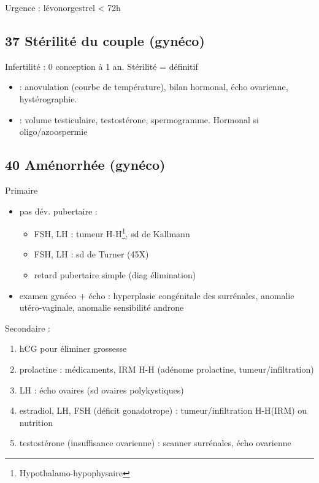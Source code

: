 \documentclass[11pt]{article}
\begin{document}
Urgence : lévonorgestrel < 72h
\subsection{37 Stérilité du couple (gynéco)}
\label{sec:orga8a0b33}
Infertilité : 0 conception à 1 an. Stérilité = définitif

\begin{itemize}
\item \female : anovulation (courbe de température), bilan hormonal, écho ovarienne, hystérographie.
\item \male : volume testiculaire, testostérone, spermogramme. Hormonal si oligo/azoospermie
\end{itemize}

\subsection{40 Aménorrhée (gynéco)}
\label{sec:org75b10ed}
Primaire
\begin{itemize}
\item pas dév. pubertaire :
\begin{itemize}
\item FSH, LH \dec : tumeur H-H\footnote{Hypothalamo-hypophysaire}, sd de Kallmann
\item FSH, LH \inc : sd de Turner (45X)
\item retard pubertaire simple (diag élimination)
\end{itemize}
\item examen gynéco + écho : hyperplasie congénitale des surrénales, anomalie
utéro-vaginale, anomalie sensibilité androne
\end{itemize}
Secondaire :
\begin{enumerate}
\item hCG pour éliminer grossesse
\item prolactine \inc : médicaments, IRM H-H (adénome prolactine, tumeur/infiltration)
\item LH \inc : écho ovaires (sd ovaires polykystiques)
\item estradiol, LH, FSH \dec (déficit gonadotrope) : tumeur/infiltration H-H(IRM) ou nutrition
\item \inc testostérone (insuffisance ovarienne) : scanner surrénales, écho ovarienne
\end{enumerate}
\end{document}
